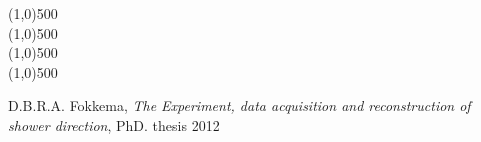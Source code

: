 \begin{center}
\line(1,0){500}
\\
\line(1,0){500}
\\
\line(1,0){500}
\\
\line(1,0){500}
\\
\end{center}
 



\begin{thebibliography}{9}
        D.B.R.A. Fokkema, \emph{The \hisparc Experiment, data acquisition and reconstruction of shower direction}, PhD. thesis 2012
\end{thebibliography}




